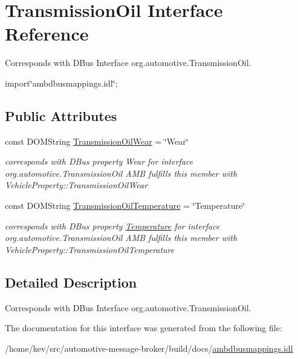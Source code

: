 \hypertarget{interfaceTransmissionOil}{\section{Transmission\+Oil Interface Reference}
\label{interfaceTransmissionOil}
}


Corresponds with D\+Bus Interface org.\+automotive.\+Transmission\+Oil.  




{\ttfamily import\char`\"{}ambdbusmappings.\+idl\char`\"{};}

\subsection*{Public Attributes}
\begin{DoxyCompactItemize}
\item 
\hypertarget{interfaceTransmissionOil_ac6a359c9ab6e301e755ac596cc17d9c5}{const D\+O\+M\+String \hyperlink{interfaceTransmissionOil_ac6a359c9ab6e301e755ac596cc17d9c5}{Transmission\+Oil\+Wear} = \char`\"{}Wear\char`\"{}}\label{interfaceTransmissionOil_ac6a359c9ab6e301e755ac596cc17d9c5}

\begin{DoxyCompactList}\small\item\em corresponds with D\+Bus property Wear for interface org.\+automotive.\+Transmission\+Oil A\+M\+B fulfills this member with Vehicle\+Property\+::\+Transmission\+Oil\+Wear \end{DoxyCompactList}\item 
\hypertarget{interfaceTransmissionOil_a4c80a5b4e084867bcac6697ba0eca6ab}{const D\+O\+M\+String \hyperlink{interfaceTransmissionOil_a4c80a5b4e084867bcac6697ba0eca6ab}{Transmission\+Oil\+Temperature} = \char`\"{}Temperature\char`\"{}}\label{interfaceTransmissionOil_a4c80a5b4e084867bcac6697ba0eca6ab}

\begin{DoxyCompactList}\small\item\em corresponds with D\+Bus property \hyperlink{interfaceTemperature}{Temperature} for interface org.\+automotive.\+Transmission\+Oil A\+M\+B fulfills this member with Vehicle\+Property\+::\+Transmission\+Oil\+Temperature \end{DoxyCompactList}\end{DoxyCompactItemize}


\subsection{Detailed Description}
Corresponds with D\+Bus Interface org.\+automotive.\+Transmission\+Oil. 

The documentation for this interface was generated from the following file\+:\begin{DoxyCompactItemize}
\item 
/home/kev/src/automotive-\/message-\/broker/build/docs/\hyperlink{ambdbusmappings_8idl}{ambdbusmappings.\+idl}\end{DoxyCompactItemize}
